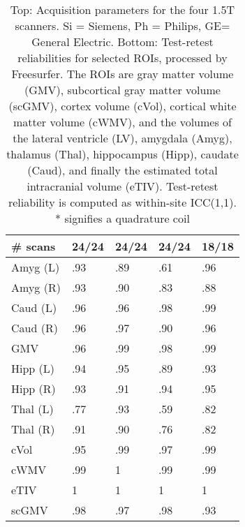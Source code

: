 \begin{table}[H]
\begin{tabular}{lllll}
\# scans              & 24/24 & 24/24 & 24/24 &18/18\\
\midrule
Amyg (L)              &               .93 &               .89 &                 .61 &                 .96 \\
Amyg (R)              &               .93 &               .90 &                 .83 &                 .88 \\
Caud (L)              &               .96 &               .96 &                 .98 &                 .99 \\
Caud (R)              &               .96 &               .97 &                 .90 &                 .96 \\
GMV                   &               .96 &               .99 &                 .98 &                 .99 \\
Hipp (L)              &               .94 &               .95 &                 .89 &                 .93 \\
Hipp (R)              &               .93 &               .91 &                 .94 &                 .95 \\
Thal (L)              &               .77 &               .93 &                 .59 &                 .82 \\
Thal (R)              &               .91 &               .90 &                 .76 &                 .82 \\
cVol                  &               .95 &               .99 &                 .97 &                 .99 \\
cWMV                  &               .99 &               1 &                 .99 &                 .99 \\
eTIV                  &               1 &               1 &                 1 &                 1 \\
scGMV                 &               .98 &               .97 &                 .98 &                 .93 \\
\bottomrule
\end{tabular}
\caption{Top: Acquisition parameters for the four 1.5T scanners. Si = Siemens, Ph = Philips, GE= General Electric. Bottom: Test-retest reliabilities for selected ROIs, processed by Freesurfer. The ROIs are gray matter volume (GMV), subcortical gray matter volume (scGMV), cortex volume (cVol), cortical white matter volume (cWMV), and the volumes of the lateral ventricle (LV), amygdala (Amyg), thalamus (Thal), hippocampus (Hipp), caudate (Caud), and finally the estimated total intracranial volume (eTIV). Test-retest reliability is computed as within-site ICC(1,1). * signifies a quadrature coil} 
\label{tab:acquisition1}

\end{table}